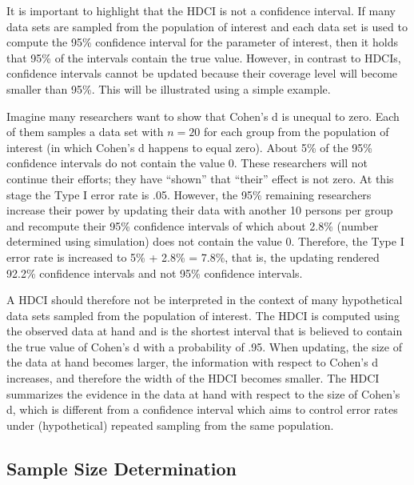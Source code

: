\documentclass[
  letterpaper,
  DIV=11,
  numbers=noendperiod]{scrartcl}
\begin{document}
It is important to highlight that the HDCI is not a confidence interval.
If many data sets are sampled from the population of interest and each
data set is used to compute the 95\% confidence interval for the
parameter of interest, then it holds that 95\% of the intervals contain
the true value. However, in contrast to HDCIs, confidence intervals
cannot be updated because their coverage level will become smaller than
95\%. This will be illustrated using a simple example.

Imagine many researchers want to show that Cohen's d is unequal to zero.
Each of them samples a data set with \(n = 20\) for each group from the
population of interest (in which Cohen's d happens to equal zero). About
5\% of the 95\% confidence intervals do not contain the value 0. These
researchers will not continue their efforts; they have ``shown'' that
``their'' effect is not zero. At this stage the Type I error rate is
.05. However, the 95\% remaining researchers increase their power by
updating their data with another 10 persons per group and recompute
their 95\% confidence intervals of which about 2.8\% (number determined
using simulation) does not contain the value 0. Therefore, the Type I
error rate is increased to 5\% + 2.8\% = 7.8\%, that is, the updating
rendered 92.2\% confidence intervals and not 95\% confidence intervals.

A HDCI should therefore not be interpreted in the context of many
hypothetical data sets sampled from the population of interest. The HDCI
is computed using the observed data at hand and is the shortest interval
that is believed to contain the true value of Cohen's d with a
probability of .95. When updating, the size of the data at hand becomes
larger, the information with respect to Cohen's d increases, and
therefore the width of the HDCI becomes smaller. The HDCI summarizes the
evidence in the data at hand with respect to the size of Cohen's d,
which is different from a confidence interval which aims to control
error rates under (hypothetical) repeated sampling from the same
population.

\subsection{Sample Size Determination}\label{sample-size-determination}
\end{document}
